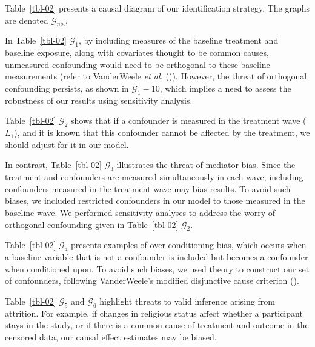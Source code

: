 \documentclass[
  single column]{article}
\begin{document}
Table~\ref{tbl-02} presents a causal diagram of our identification
strategy. The graphs are denoted \(\mathcal{G}_{no.}\).

In Table~\ref{tbl-02} \(\mathcal{G}_1\), by including measures of the
baseline treatment and baseline exposure, along with covariates thought
to be common causes, unmeasured confounding would need to be orthogonal
to these baseline measurements (refer to VanderWeele \emph{et al.}
()). However, the threat of
orthogonal confounding persists, as shown in \(\mathcal{G}_1-10\), which
implies a need to assess the robustness of our results using sensitivity
analysis.

Table~\ref{tbl-02} \(\mathcal{G}_2\) shows that if a confounder is
measured in the treatment wave (\(L_1\)), and it is known that this
confounder cannot be affected by the treatment, we should adjust for it
in our model.

In contrast, Table~\ref{tbl-02} \(\mathcal{G}_3\) illustrates the threat
of mediator bias. Since the treatment and confounders are measured
simultaneously in each wave, including confounders measured in the
treatment wave may bias results. To avoid such biases, we included
restricted confounders in our model to those measured in the baseline
wave. We performed sensitivity analyses to address the worry of
orthogonal confounding given in Table~\ref{tbl-02} \(\mathcal{G}_2\).

Table~\ref{tbl-02} \(\mathcal{G}_4\) presents examples of
over-conditioning bias, which occurs when a baseline variable that is
not a confounder is included but becomes a confounder when conditioned
upon. To avoid such biases, we used theory to construct our set of
confounders, following VanderWeele's modified disjunctive cause
criterion ().

Table~\ref{tbl-02} \(\mathcal{G}_5\) and \(\mathcal{G}_6\) highlight
threats to valid inference arising from attrition. For example, if
changes in religious status affect whether a participant stays in the
study, or if there is a common cause of treatment and outcome in the
censored data, our causal effect estimates may be biased.
\end{document}
